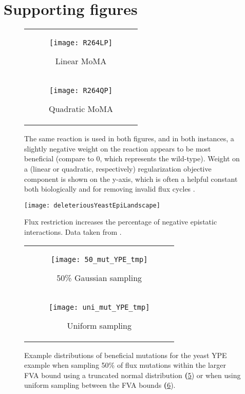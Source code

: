 \section{Supporting figures}

\begin{figure}[H]
\centering
\begin{tabular}{c}
\begin{subfigure}[b]{\textwidth}
  \texttt{[image: R264LP]}
  \caption{Linear MoMA} 
  \label{fig:R264LP}
\end{subfigure}
\\
\begin{subfigure}[b]{\textwidth}
  \texttt{[image: R264QP]}
  \caption{Quadratic MoMA} 
  \label{fig:R264QP}
\end{subfigure}
\\
\end{tabular}
\caption{The same reaction is used in both figures, and in both
instances, a slightly negative weight on the reaction appears to be
most beneficial (compare to 0, which represents the wild-type).
Weight on a (linear or quadratic, respectively) 
regularization objective component is shown on the y-axis, which is often a helpful
constant both biologically and for removing invalid flux cycles 
\citep{Schuetz2012, Smallbone2009a}.}
\label{fig:wMoMA_smoothness}
\end{figure}

\begin{figure}[H]
\centering
  \texttt{[image: deleteriousYeastEpiLandscape]}
  \caption{Flux restriction increases the percentage of negative
  epistatic interactions. Data taken from \citet{Xu2012}.}
  \label{fig:delYeastEpiLandscape}
\end{figure}

\begin{figure}[H]
\centering
\begin{tabular}{c}
\begin{subfigure}[b]{\textwidth}
  \texttt{[image: 50\_mut\_YPE\_tmp]}
  \caption{50\% Gaussian sampling} 
  \label{fig:beneEpiPairwise:50}
\end{subfigure}
\\
\begin{subfigure}[b]{\textwidth}
  \texttt{[image: uni\_mut\_YPE\_tmp]}
  \caption{Uniform sampling}
  \label{fig:beneEpiPairwise:uni}
\end{subfigure}
\\
\end{tabular}
\caption{Example distributions of beneficial mutations for the yeast
YPE example when sampling 50\% of flux mutations within the larger FVA
bound using a truncated normal distribution
\textbf(\ref{fig:beneEpiPairwise:50}) or when using uniform sampling
between the FVA bounds \textbf(\ref{fig:beneEpiPairwise:uni}).}
\label{fig:50andUniSampling}
\end{figure}


